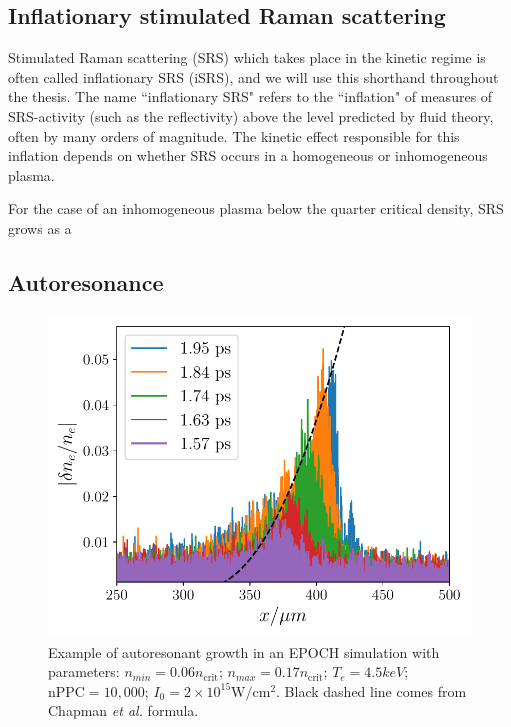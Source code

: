 \subsection{Inflationary stimulated Raman scattering}

Stimulated Raman scattering (\acrshort{SRS}) which takes place in the kinetic regime is often called inflationary SRS (\acrshort{iSRS}), and we will use this shorthand throughout the thesis. The name ``inflationary SRS" refers to the ``inflation" of measures of SRS-activity (such as the reflectivity) above the level predicted by fluid theory, often by many orders of magnitude. The kinetic effect responsible for this inflation depends on whether SRS occurs in a homogeneous or inhomogeneous plasma.

For the case of an inhomogeneous plasma below the quarter critical density, SRS grows as a 




\subsection{Autoresonance}

\begin{figure}[ht]
    \centering
    \includegraphics[width=0.8\columnwidth]{Chapters/C2_Theory/AR_diagnostic.pdf}
    \caption{Example of autoresonant growth in an EPOCH simulation with parameters: $n_{min} = 0.06 n_{\text{crit}}$; $n_{max} = 0.17 n_{\text{crit}}$; $T_e = 4.5\si{keV}$; $\text{nPPC}=10,000$; $I_0 = 2 \times 10^{15}\si{\watt / \centi\metre^2}$. Black dashed line comes from Chapman \textit{et al.} \citep{Chapman2012} formula.}
    \label{fig:AR_diagnostic}
\end{figure}{}


